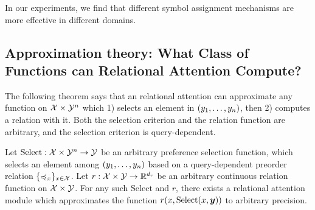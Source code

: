 In our experiments, we find that different symbol assignment mechanisms are more effective in different domains.



\subsection{Approximation theory: What Class of Functions can Relational Attention Compute?}

The following theorem says that an relational attention can approximate any function on ${\mathcal{X}} \times {\mathcal{Y}}^n$ which 1) selects an element in $(y_1, \ldots, y_n)$, then 2) computes a relation with it. Both the selection criterion and the relation function are arbitrary, and the selection criterion is query-dependent.
\begin{theorem}[Informal]
  Let $\mathrm{Select}: {\mathcal{X}} \times {\mathcal{Y}}^n \to {\mathcal{Y}}$ be an arbitrary preference selection function, which selects an element among $(y_1, \ldots, y_n)$ based on a query-dependent preorder relation $\{\preccurlyeq_x\}_{x \in {\mathcal{X}}}$. Let $r: {\mathcal{X}} \times {\mathcal{Y}} \to \mathbb{R}^{d_r}$ be an arbitrary continuous relation function on ${\mathcal{X}} \times {\mathcal{Y}}$. For any such $\mathrm{Select}$ and $r$, there exists a relational attention module which approximates the function $r(x, \mathrm{Select}(x, \bm{y}))$ to arbitrary precision.
\end{theorem}